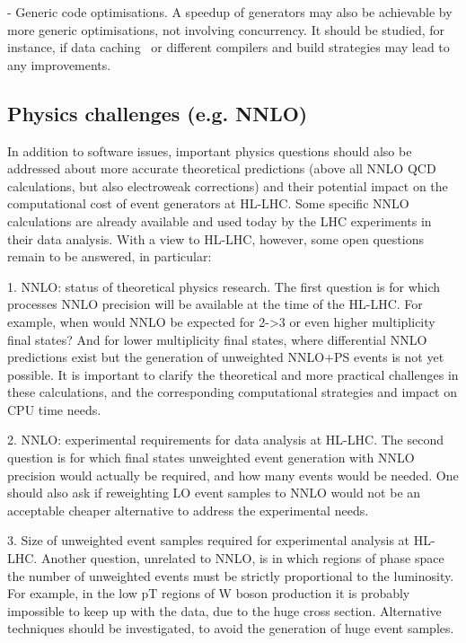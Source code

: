 \documentclass[11pt,a4paper]{article}
\begin{document}
- {Generic code optimisations}. A speedup of generators may also be
achievable by more generic optimisations, not involving concurrency. It
should be studied, for instance, if data caching~\cite{Kon20} or
different compilers and build strategies may lead to any improvements.

\hypertarget{physics-challenges-e.g.-nnlo}{%
\subsection{Physics challenges (e.g.
NNLO)}\label{physics-challenges-e.g.-nnlo}}

In addition to software issues, important physics questions should also
be addressed about more accurate theoretical predictions (above all NNLO
QCD calculations, but also electroweak corrections) and their potential
impact on the computational cost of event generators at HL-LHC. Some
specific NNLO calculations are already available and used today by the
LHC experiments in their data analysis. With a view to HL-LHC, however,
some open questions remain to be answered, in particular:

1. {NNLO: status of theoretical physics research}. The first question is
for which processes NNLO precision will be available at the time of the
HL-LHC. For example, when would NNLO be expected for 2-\textgreater3 or
even higher multiplicity final states? And for lower multiplicity final
states, where differential NNLO predictions exist but the generation of
unweighted NNLO+PS events is not yet possible. It is important to
clarify the theoretical and more practical challenges in these
calculations, and the corresponding computational strategies and impact
on CPU time needs.

2. {NNLO: experimental requirements for data analysis at HL-LHC}. The
second question is for which final states unweighted event generation
with NNLO precision would actually be required, and how many events
would be needed. One should also ask if reweighting LO event samples to
NNLO would not be an acceptable cheaper alternative to address the
experimental needs.

3. {Size of unweighted event samples required for experimental analysis
at HL-LHC}. Another question, unrelated to NNLO, is in which regions of
phase space the number of unweighted events must be strictly
proportional to the luminosity. For example, in the low pT regions of W
boson production it is probably impossible to keep up with the data, due
to the huge cross section. Alternative techniques should be
investigated, to avoid the generation of huge event samples.
\end{document}

